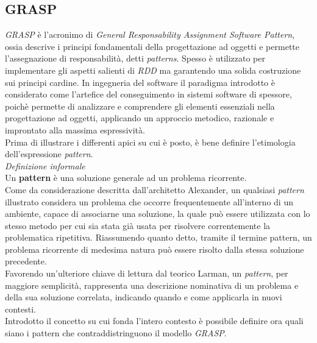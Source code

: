 \documentclass{article}
\begin{document}
\subsection*{GRASP}
\large
\textit{GRASP} è l'acronimo di \textit{General Responsability Assignment Software Pattern}, ossia descrive i principi fondamentali della progettazione ad oggetti e permette l'assegnazione di responsabilità, detti \textit{patterns}. Spesso è utilizzato per implementare gli aspetti salienti di \textit{RDD} ma garantendo una solida costruzione sui principi cardine. In ingegneria del software il paradigma introdotto è considerato come l'artefice del conseguimento in sistemi software di spessore, poichè permette di analizzare e comprendere gli elementi essenziali nella progettazione ad oggetti, applicando un approccio metodico, razionale e improntato alla massima espressività.\vspace*{14pt}\\
Prima di illustrare i differenti apici su cui è posto, è bene definire l'etimologia dell'espressione \textit{pattern}.\vspace*{14pt}\\
\textit{Definizione informale}\\
Un \textbf{pattern} è una soluzione generale ad un problema ricorrente.\vspace*{14pt}\\
Come da considerazione descritta dall'architetto Alexander, un qualsiasi \textit{pattern} illustrato considera un problema che occorre frequentemente all'interno di un ambiente, capace di associarne una soluzione, la quale può essere utilizzata con lo stesso metodo per cui sia stata già usata per risolvere correntemente la problematica ripetitiva. Riassumendo quanto detto, tramite il termine pattern, un problema ricorrente di medesima natura può essere risolto dalla stessa soluzione precedente.\vspace*{14pt}\\
Favorendo un'ulteriore chiave di lettura dal teorico Larman, un \textit{pattern}, per maggiore semplicità, rappresenta una descrizione nominativa di un problema e della sua soluzione correlata, indicando quando e come applicarla in nuovi contesti.\vspace*{14pt}\\
Introdotto il concetto su cui fonda l'intero contesto è possibile definire ora quali siano i pattern che contraddistringuono il modello \textit{GRASP}.
\end{document}
